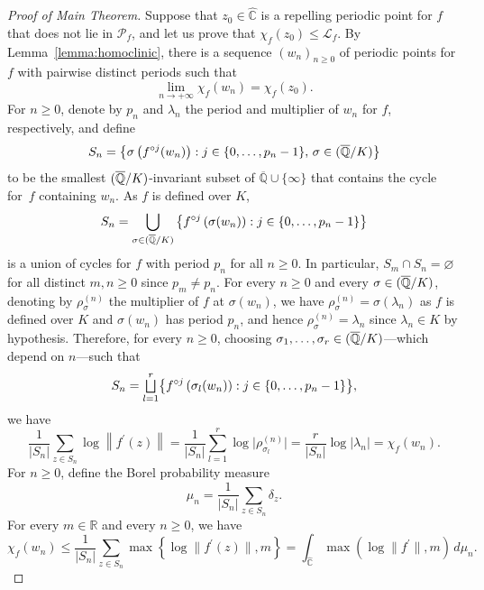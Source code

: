 \documentclass[JEP,XML,SOM,Unicode,published]{cedram}
\newcommand{\NoChangel}[1]{%
\expandafter\let\csname old\string#1\endcsname=#1
\let#1=\relax
\newcommand{#1}{\mathcode`l="716C\csname old\string#1\endcsname\mathcode`l="7160 }%
}
\let\oldbigsqcup\bigsqcup
\renewcommand{\bigsqcup}{\mathop{\textstyle\oldbigsqcup}\displaylimits}
\theoremstyle{plain}
\theoremstyle{definition}
\theoremstyle{remark}
\DeclareMathOperator{\Gal}{Gal}\NoChangel{\Gal}
\begin{document}
\begin{proof}[Proof of Main Theorem]
Suppose that $z_{0} \in \widehat{\mathbb{C}}$ is a repelling periodic point for $f$ that does not lie in $\mathcal{P}_{f}$, and let us prove that $\chi_{f}(z_{0}) \leq \mathcal{L}_{f}$. By Lemma~\ref{lemma:homoclinic}, there is a sequence $(w_{n})_{n \geq 0}$ of periodic points for $f$ with pairwise distinct periods such that
\[
\lim_{n \to +\infty} \chi_{f}(w_{n}) = \chi_{f}(z_{0}).
\]
For $n \geq 0$, denote by $p_{n}$ and $\lambda_{n}$ the period and multiplier of $w_{n}$ for $f$, respectively, and define
\[
S_{n} = \bigl\lbrace \sigma\left(f^{\circ j}(w_{n}) \right) : j \in\lbrace 0, \dotsc, p_{n} -1\rbrace, \, \sigma \in \Gal(\overline{\mathbb{Q}}/K) \bigr\rbrace
\]
to be the smallest $\Gal(\overline{\mathbb{Q}}/K)$\nobreakdash-invariant subset of $\overline{\mathbb{Q}} \cup \lbrace \infty \rbrace$ that contains the cycle for~$f$ containing $w_{n}$. As $f$ is defined over $K$,
\[
S_{n} = \bigcup_{\sigma \in \Gal(\overline{\mathbb{Q}}/K)} \left\lbrace f^{\circ j}\left(\sigma(w_{n}) \right) : j \in\lbrace 0, \dotsc, p_{n} -1\rbrace \right\rbrace
\]
is a union of cycles for $f$ with period $p_{n}$ for all $n \geq 0$. In particular, $S_{m} \cap S_{n} = \varnothing$ for all distinct $m, n \geq 0$ since $p_{m} \neq p_{n}$. For every $n \geq 0$ and every $\sigma \in \Gal(\overline{\mathbb{Q}}/K)$, denoting by $\rho_{\sigma}^{(n)}$ the multiplier of $f$ at $\sigma(w_{n})$, we have $\rho_{\sigma}^{(n)} = \sigma\left(\lambda_{n} \right)$ as $f$ is defined over $K$ and $\sigma(w_{n})$ has period $p_{n}$, and hence $\rho_{\sigma}^{(n)} = \lambda_{n}$ since $\lambda_{n} \in K$ by hypothesis. Therefore, for every $n \geq 0$, choosing $\sigma_{1}, \dotsc, \sigma_{r} \in \Gal(\overline{\mathbb{Q}}/K)$---which depend on $n$---such that
\[
S_{n} = \bigsqcup_{l = 1}^{r} \bigl\lbrace f^{\circ j}\left(\sigma_{l}(w_{n}) \right) : j \in \left\lbrace 0, \dotsc, p_{n} -1 \right\rbrace \bigr\rbrace,
\]
we have
\[
\frac{1}{\left\lvert S_{n} \right\rvert} \sum_{z \in S_{n}} \log\left\lVert f^{\prime}(z) \right\rVert = \frac{1}{\left\lvert S_{n} \right\rvert} \sum_{l = 1}^{r} \log\vert \rho_{\sigma_{l}}^{(n)}\vert = \frac{r}{\left\lvert S_{n} \right\rvert} \log\left\lvert \lambda_{n} \right\rvert = \chi_{f}(w_{n}).
\]
For $n \geq 0$, define the Borel probability measure
\[
\mu_{n} = \frac{1}{\left\lvert S_{n} \right\rvert} \sum_{z \in S_{n}} \delta_{z}.
\]
For every $m \in \mathbb{R}$ and every $n \geq 0$, we have
\[
\chi_{f}(w_{n}) \leq \frac{1}{\left\lvert S_{n} \right\rvert} \sum_{z \in S_{n}} \max\left\lbrace \log\lVert f^{\prime}(z)\rVert, m \right\rbrace = \int_{\widehat{\mathbb{C}}} \max\left(\log\lVert f^{\prime}\rVert, m \right) \, d\mu_{n}.
\]
\end{proof}
\end{document}
